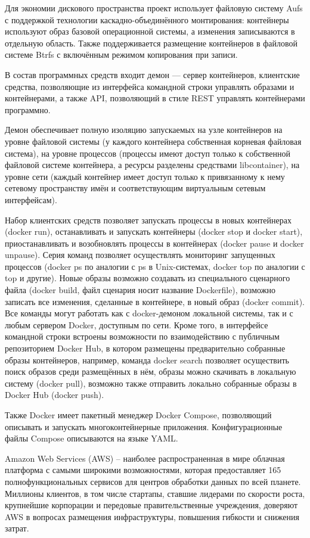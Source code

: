 Для экономии дискового пространства проект использует файловую систему Aufs с поддержкой технологии каскадно-объединённого монтирования: контейнеры используют образ базовой операционной системы, а изменения записываются в отдельную область. Также поддерживается размещение контейнеров в файловой системе Btrfs с включённым режимом копирования при записи.

В состав программных средств входит демон — сервер контейнеров, клиентские средства, позволяющие из интерфейса командной строки управлять образами и контейнерами, а также API, позволяющий в стиле REST управлять контейнерами программно.

Демон обеспечивает полную изоляцию запускаемых на узле контейнеров на уровне файловой системы (у каждого контейнера собственная корневая файловая система), на уровне процессов (процессы имеют доступ только к собственной файловой системе контейнера, а ресурсы разделены средствами libcontainer), на уровне сети (каждый контейнер имеет доступ только к привязанному к нему сетевому пространству имён и соответствующим виртуальным сетевым интерфейсам).

Набор клиентских средств позволяет запускать процессы в новых контейнерах (docker run), останавливать и запускать контейнеры (docker stop и docker start), приостанавливать и возобновлять процессы в контейнерах (docker pause и docker unpause). Серия команд позволяет осуществлять мониторинг запущенных процессов (docker ps по аналогии с ps в Unix-системах, docker top по аналогии с top и другие). Новые образы возможно создавать из специального сценарного файла (docker build, файл сценария носит название Dockerfile), возможно записать все изменения, сделанные в контейнере, в новый образ (docker commit). Все команды могут работать как с docker-демоном локальной системы, так и с любым сервером Docker, доступным по сети. Кроме того, в интерфейсе командной строки встроены возможности по взаимодействию с публичным репозиторием Docker Hub, в котором размещены предварительно собранные образы контейнеров, например, команда docker search позволяет осуществить поиск образов среди размещённых в нём, образы можно скачивать в локальную систему (docker pull), возможно также отправить локально собранные образы в Docker Hub (docker push).

Также Docker имеет пакетный менеджер Docker Compose, позволяющий описывать и запускать многоконтейнерные приложения. Конфигурационные файлы Compose описываются на языке YAML.

Amazon Web Services (AWS) – наиболее распространенная в мире облачная платформа с самыми широкими возможностями, которая предоставляет 165 полнофункциональных сервисов для центров обработки данных по всей планете. Миллионы клиентов, в том числе стартапы, ставшие лидерами по скорости роста, крупнейшие корпорации и передовые правительственные учреждения, доверяют AWS в вопросах размещения инфраструктуры, повышения гибкости и снижения затрат.

